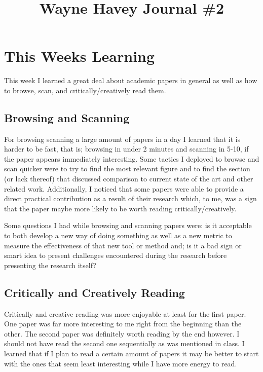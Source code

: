 \documentclass[conference]{IEEEtran}
\begin{document}
\title{Wayne Havey Journal \#2\\
}

\author{
}

\maketitle

\section{This Weeks Learning}
This week I learned a great deal about academic papers in general as well as how to browse, scan, and critically/creatively read them. 

\subsection{Browsing and Scanning}
For browsing scanning a large amount of papers in a day I learned that it is harder to be fast, that is; browsing in under 2 minutes and scanning in 5-10, if the paper appears immediately interesting. Some tactics I deployed to browse and scan quicker were to try to find the most relevant figure and to find the section (or lack thereof) that discussed comparison to current state of the art and other related work. Additionally, I noticed that some papers were able to provide a direct practical contribution as a result of their research which, to me, was a sign that the paper maybe more likely to be worth reading critically/creatively. 

Some questions I had while browsing and scanning papers were: is it acceptable to both develop a new way of doing something as well as a new metric to measure the effectiveness of that new tool or method and; is it a bad  sign or smart idea to present challenges encountered during the research before presenting the research itself?

\subsection{Critically and Creatively Reading}
Critically and creative reading was more enjoyable at least for the first paper. One paper was far more interesting to me right from the beginning than the other. The second paper was definitely worth reading by the end however. I should not have read the second one sequentially as was mentioned in class. I learned that if I plan to read a certain amount of papers it may be better to start with the ones that seem least interesting while I have more energy to read.
\end{document}
